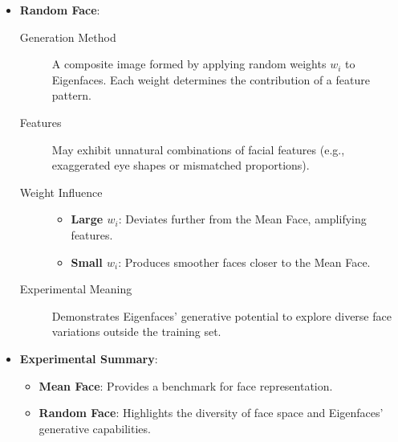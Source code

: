 \documentclass{article}
\begin{document}
\begin{itemize}
\begin{itemize}
			\item \textbf{Random Face}:
			\begin{description}
				\item[Generation Method] A composite image formed by applying random weights \(w_i\) to Eigenfaces. Each weight determines the contribution of a feature pattern.
				\item[Features] May exhibit unnatural combinations of facial features (e.g., exaggerated eye shapes or mismatched proportions).
				\item[Weight Influence] 
				\begin{itemize}
					\item \textbf{Large \(w_i\)}: Deviates further from the Mean Face, amplifying features.
					\item \textbf{Small \(w_i\)}: Produces smoother faces closer to the Mean Face.
				\end{itemize}
				\item[Experimental Meaning] Demonstrates Eigenfaces' generative potential to explore diverse face variations outside the training set.
			\end{description}
			
			\item \textbf{Experimental Summary}:
			\begin{itemize}
				\item \textbf{Mean Face}: Provides a benchmark for face representation.
				\item \textbf{Random Face}: Highlights the diversity of face space and Eigenfaces' generative capabilities.
			\end{itemize}
		\end{itemize}
	\end{itemize}
\end{document}
